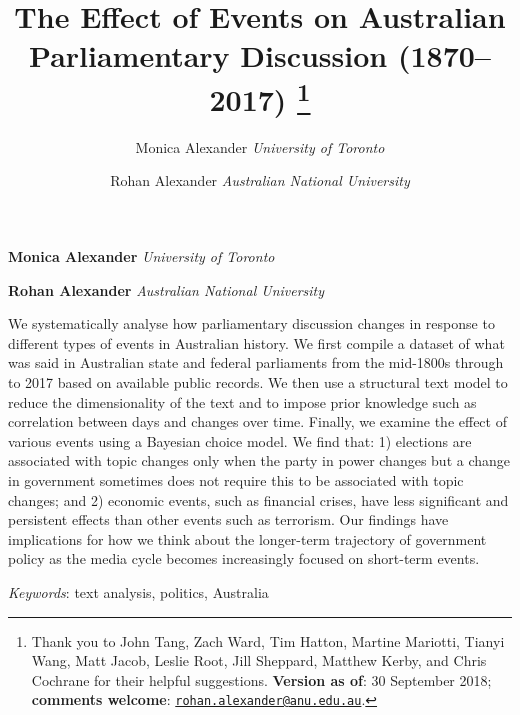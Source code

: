 \documentclass[12pt,]{article}
\title{The Effect of Events on Australian Parliamentary Discussion (1870--2017) \thanks{Thank you to John Tang, Zach Ward, Tim Hatton, Martine Mariotti, Tianyi
Wang, Matt Jacob, Leslie Root, Jill Sheppard, Matthew Kerby, and Chris
Cochrane for their helpful suggestions. \textbf{Version as of}: 30
September 2018; \textbf{comments welcome}:
\href{mailto:rohan.alexander@anu.edu.au}{\nolinkurl{rohan.alexander@anu.edu.au}}.}  }
\author{\Large Monica Alexander\vspace{0.05in} \newline\normalsize\emph{University of Toronto}   \and \Large Rohan Alexander\vspace{0.05in} \newline\normalsize\emph{Australian National University}  }
\date{}
\newcommand*{\authorfont}{\fontfamily{phv}\selectfont}
\renewenvironment{abstract}
 {{%
    \setlength{\leftmargin}{0mm}
    \setlength{\rightmargin}{\leftmargin}%
  }%
  \relax}
 {\endlist}
\theoremstyle{definition}
\theoremstyle{definition}
\theoremstyle{definition}
\theoremstyle{remark}
\begin{document}
	
%

{%
\setlength{\parindent}{0pt}
\thispagestyle{plain}
{\fontsize{18}{20}\selectfont\raggedright 
\maketitle  %

}

{
   \vskip 13.5pt\relax \normalsize\fontsize{11}{12} 
\textbf{\authorfont Monica Alexander} \hskip 15pt \emph{\small University of Toronto}   \par \textbf{\authorfont Rohan Alexander} \hskip 15pt \emph{\small Australian National University}   

}

}








\begin{abstract}

    \hbox{\vrule height .2pt width 39.14pc}

    \vskip 8.5pt %

\noindent We systematically analyse how parliamentary discussion changes in
response to different types of events in Australian history. We first
compile a dataset of what was said in Australian state and federal
parliaments from the mid-1800s through to 2017 based on available public
records. We then use a structural text model to reduce the
dimensionality of the text and to impose prior knowledge such as
correlation between days and changes over time. Finally, we examine the
effect of various events using a Bayesian choice model. We find that: 1)
elections are associated with topic changes only when the party in power
changes but a change in government sometimes does not require this to be
associated with topic changes; and 2) economic events, such as financial
crises, have less significant and persistent effects than other events
such as terrorism. Our findings have implications for how we think about
the longer-term trajectory of government policy as the media cycle
becomes increasingly focused on short-term events.


\vskip 8.5pt \noindent \emph{Keywords}: text analysis, politics, Australia \par

    \hbox{\vrule height .2pt width 39.14pc}



\end{abstract}
\end{document}
